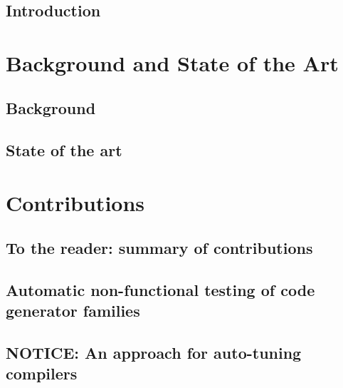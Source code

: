 \documentclass[letterpaper,12pt,titlepage, english, openright]{book}
\let\origdoublepage\cleardoublepage
\newcommand{\clearemptydoublepage}{%
  \clearpage{\pagestyle{empty}\origdoublepage}}
\let\cleardoublepage\clearemptydoublepage
\begin{document}
\addtocounter{page}{-1}%



~\cleardoublepage


\frontmatter

\tableofcontents%

 


\mainmatter

%
\chapter[Introduction]{Introduction}\label{chap:intro}

\part{Background and State of the Art}
\chapter[Background]{Background}\label{chap:background}

\chapter[State of the art]{State of the art}\label{chap:SOTA}

\part{Contributions}
\chapter*{To the reader: summary of contributions}\label{chap:summary}

\chapter[Automatic non-functional testing of code generator families]{Automatic non-functional testing of code generator families}\label{chap:code generators}

\chapter[NOTICE: An approach for auto-tuning compilers]{NOTICE: An approach for auto-tuning compilers}\label{chap:compilers}

\end{document}
